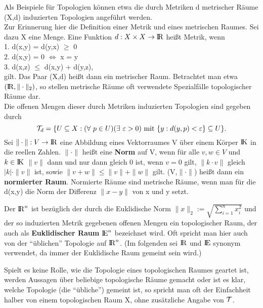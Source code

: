 Als Beispiele für Topologien können etwa die durch Metriken
d metrischer Räume (X,d) induzierten Topologien angeführt werden.\\
{\scsi
Zur Erinnerung hier die Definition einer Metrik und eines metrischen Raumes.
Sei dazu X eine Menge. Eine Funktion $d:X\times X\to\mbox{$\rm I\!R$}$ heißt Metrik, wenn\\
1. d(x,y) = d(y,x) $\geq$ 0\\
2. d(x,y) = 0 $\iff$ x = y\\
3. d(x,z) $\leq$ d(x,y) + d(y,z),\\
gilt. Das Paar (X,d) heißt dann ein metrischer Raum. Betrachtet man etwa
$(\mbox{$\rm I\!R$},\|\cdot\|_2)$, so stellen metrische Räume oft verwendete Spezialfälle
topologischer Räume dar.
}\\
Die offenen Mengen dieser durch Metriken induzierten Topologien sind gegeben
durch
$${\cal T}_d=\{U\subseteq X:(\forall~p\in U) (\exists~\varepsilon > 0)
\mbox{ mit } \{y:d(y,p)<\varepsilon\}\subseteq U\}.$$
Sei $\|\cdot\|:V\to\mbox{$\rm I\!R$}$ eine Abbildung eines Vektorraumes V über einem Körper
$\mbox{$\rm I\!K$}$ in die reellen Zahlen. $\|\cdot\|$ heißt eine {\bf Norm} auf V,
wenn für alle $v,w\in V$ und $k\in\mbox{$\rm I\!K$}$ $\|v\|$ dann und nur dann gleich 0 ist,
wenn $v=0$ gilt, $\|k\cdot v\|$ gleich $|k|\cdot\|v\|$ ist, sowie $\|v+w\|\leq
\|v\|+\|w\|$ gilt. (V,$\|\cdot\|$) heißt dann ein {\bf normierter Raum}.
 Normierte Räume sind metrische Räume, wenn man für
die d(x,y) die Norm der Differenz $\|x-y\|$ von x und y setzt.

Der $\mbox{$\rm I\!R$}^n$ ist bezüglich der durch die Euklidische Norm $\|x\|_2 :=
\sqrt{\sum_{i=1}^n x_i^2}$ und der so induzierten Metrik gegebenen
offenen Mengen ein topologischer Raum, der auch als {\bf Euklidischer Raum}
$\mbox{$\rm I\!E$}^n$ bezeichnet wird. Oft spricht man hier auch von der "`üblichen"'
Topologie auf $\mbox{$\rm I\!R$}^n$. (Im folgenden sei $\mbox{$\rm I\!R$}$ und $\mbox{$\rm I\!E$}$ synonym verwendet, da immer
der Euklidische Raum gemeint sein wird.)

Spielt es keine Rolle, wie die Topologie eines topologischen Raumes
geartet ist, werden Aussagen über beliebige topologische Räume gemacht
oder ist es klar, welche Topologie (die "`übliche"') gemeint ist, so spricht
man oft der Einfachheit halber von einem topologischen Raum X, ohne
zusätzliche Angabe von ${\cal T}$.

